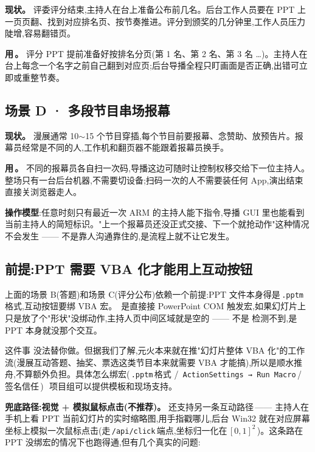 \textbf{现状。} 评委评分结束,主持人在台上准备公布前几名。后台工作人员要在 PPT 上一页页翻、找到对应排名页、按节奏推进。评分到颁奖的几分钟里,工作人员压力陡增,容易翻错页。

\textbf{用\,\app。} 评分 PPT 提前准备好按排名分页(第 1 名、第 2 名、第 3 名 …)。主持人在台上每念一个名字之前自己翻到对应页;后台导播全程只盯画面是否正确,出错可立即或重整节奏。

\subsection{场景 D · 多段节目串场报幕}

\textbf{现状。} 漫展通常 10$\sim$15 个节目穿插,每个节目前要报幕、念赞助、放预告片。报幕员经常是不同的人,工作机和翻页器不能跟着报幕员换手。

\textbf{用\,\app。} 不同的报幕员各自扫一次码,导播这边可随时让控制权移交给下一位主持人。整场只有一台后台机器,不需要切设备;扫码一次的人不需要装任何 App,演出结束直接关浏览器走人。

\begin{infobox}
\textbf{操作模型}:任意时刻只有最近一次 ARM 的主持人能下指令,导播 GUI 里也能看到当前主持人的简短标识。"上一个报幕员还没正式交接、下一个就抢动作"这种情况不会发生 —— 不是靠人沟通靠住的,是流程上就不让它发生。
\end{infobox}

\subsection{前提:PPT 需要 VBA 化才能用上互动按钮}
\label{sec:vba-prerequisite}

上面的场景 B(答题)和场景 C(评分公布)依赖一个前提:PPT 文件本身得是\,\texttt{.pptm}\,格式,互动按钮要绑 VBA 宏。\app\ 是直接接 PowerPoint COM 触发宏,如果幻灯片上只是放了个"形状"没绑动作,主持人页中间区域就是空的 —— 不是\,\app\,检测不到,是 PPT 本身就没那个交互。

这件事\,\app\,没法替你做。但据我们了解,元火本来就在推"幻灯片整体 VBA 化"的工作流(漫展互动答题、抽奖、票选这类节目本来就需要 VBA 才能搞),所以是顺水推舟,不算额外负担。具体怎么绑宏(\,\texttt{.pptm}\,格式 / \,\texttt{ActionSettings → Run Macro}\,/\,签名信任\,)\,\app\ 项目组可以提供模板和现场支持。

\textbf{兜底路径:视觉 + 模拟鼠标点击(不推荐)。}\,\app\,还支持另一条互动路径\,—— 主持人在手机上看 PPT 当前幻灯片的实时缩略图,用手指戳哪儿,后台 Win32 就在对应屏幕坐标上模拟一次鼠标点击(走\,\texttt{/api/click}\,端点,坐标归一化在\,$[0,1]^2$\,)。这条路在 PPT 没绑宏的情况下也跑得通,但有几个真实的问题:

